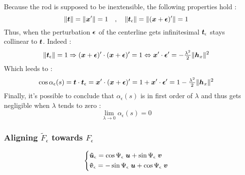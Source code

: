 Because the rod is supposed to be inextensible, the following properties hold :
\begin{equation}
	\|\boldsymbol{t}\| = \|\boldsymbol{x}'\| = 1 \quad,\quad \|\boldsymbol{t}_\epsilon\| = \|(\boldsymbol{x}+\boldsymbol{\epsilon})'\| = 1
\end{equation}
Thus, when the perturbation $\boldsymbol{\epsilon}$ of the centerline gets infinitesimal $\boldsymbol{t}_\epsilon$ stays collinear to $\boldsymbol{t}$. Indeed :
\begin{equation}
		\|\boldsymbol{t}_\epsilon\| = 1 
		\Rightarrow  (\boldsymbol{x}+\boldsymbol{\epsilon})' \cdot (\boldsymbol{x}+\boldsymbol{\epsilon})' = 1
		\Leftrightarrow  \boldsymbol{x}'\cdot\boldsymbol{\epsilon}' = - \tfrac{\lambda^2}{2}\|\boldsymbol{h}_x\|^2
\end{equation}
Which leeds to :
\begin{equation}
		\cos \alpha_\epsilon(s) = \boldsymbol{t} \cdot \boldsymbol{t}_\epsilon = \boldsymbol{x}' \cdot (\boldsymbol{x}+\boldsymbol{\epsilon})'
		= 1 + \boldsymbol{x}' \cdot \boldsymbol{\epsilon}'
		= 1 - \tfrac{\lambda^2}{2}\|\boldsymbol{h}_x\|^2
\end{equation}
Finally, it's possible to conclude that $\alpha_\epsilon(s)$ is in first order of $\lambda$ and thus gets negligible when $\lambda$ tends to zero :
\begin{equation}
	\lim_{\lambda \to 0} \alpha_\epsilon(s) = 0
\end{equation}


\subsubsection{Aligning $\tilde{F}_\epsilon$ towards $F_\epsilon$}

\begin{equation}
	\left\{
	\begin{aligned}
		&\boldsymbol{\tilde{u}}_\epsilon = \cos{\Psi_\epsilon}\;\boldsymbol{u} + \sin{\Psi_\epsilon}\;\boldsymbol{v}\\
		&\boldsymbol{\tilde{v}}_\epsilon = -\sin{\Psi_\epsilon}\;\boldsymbol{u} + \cos{\Psi_\epsilon}\;\boldsymbol{v}
	\end{aligned}
	\right.
\end{equation}

